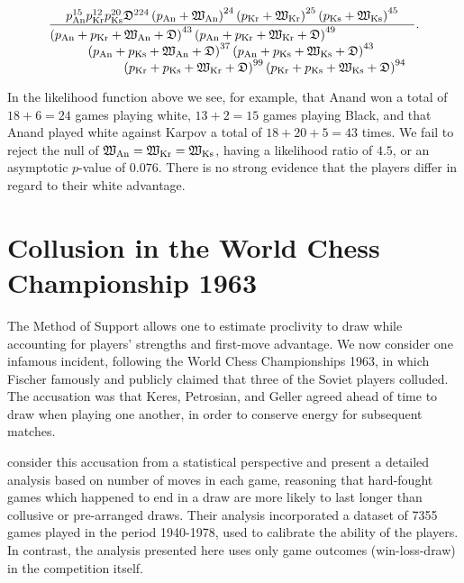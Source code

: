 \documentclass[review]{elsarticle}
\begin{document}
\begin{equation}\label{KKA_personalised_whitemonster}
\frac{
p_\mathrm{An}^{15}
p_\mathrm{Kr}^{12}
p_\mathrm{Ks}^{20}
\draw^{224}
\left(p_\mathrm{An} + \white_\mathrm{An}\right)^{24}%
\left(p_\mathrm{Kr} + \white_\mathrm{Kr}\right)^{25}
\left(p_\mathrm{Ks} + \white_\mathrm{Ks}\right)^{45}
}{\parbox{4in}{$
\left(p_\mathrm{An} + p_\mathrm{Kr} + \white_\mathrm{An} +  \draw\right)^{43}
\left(p_\mathrm{An} + p_\mathrm{Kr} + \white_\mathrm{Kr} +  \draw\right)^{49}\\ \rule{10mm}{0mm}
\left(p_\mathrm{An} + p_\mathrm{Ks} + \white_\mathrm{An} +  \draw\right)^{37}
\left(p_\mathrm{An} + p_\mathrm{Ks} + \white_\mathrm{Ks} +  \draw\right)^{43}\\ \rule{20mm}{0mm}
\left(p_\mathrm{Kr} + p_\mathrm{Ks} + \white_\mathrm{Kr} +  \draw\right)^{99}
\left(p_\mathrm{Kr} + p_\mathrm{Ks} + \white_\mathrm{Ks} +  \draw\right)^{94}
$}}.
\end{equation}

In the likelihood function above we see, for example, that Anand won a
total of $18+6=24$ games playing white, $13+2=15$ games playing Black,
and that Anand played white against Karpov a total of $18+20+5=43$
times.  We fail to reject the null of
$\mathfrak{W}_\mathrm{An}=\mathfrak{W}_\mathrm{Kr}=\mathfrak{W}_\mathrm{Ks}$, having a
likelihood ratio of $4.5$, or an asymptotic $p$-value of $0.076$.
There is no strong evidence that the players differ in regard to their
white advantage.


\section{Collusion in the World Chess Championship 1963}

The Method of Support allows one to estimate proclivity to draw while
accounting for players' strengths and first-move advantage.  We now
consider one infamous incident, following the World Chess
Championships 1963, in which Fischer famously and publicly claimed
that three of the Soviet players colluded.  The accusation was that
Keres, Petrosian, and Geller agreed ahead of time to draw when playing
one another, in order to conserve energy for subsequent matches.

\citet{moul2009} consider this accusation from a statistical
perspective and present a detailed analysis based on number of moves
in each game, reasoning that hard-fought games which happened to end
in a draw are more likely to last longer than collusive or
pre-arranged draws.  Their analysis incorporated a dataset of 7355
games played in the period 1940-1978, used to calibrate the ability of
the players.  In contrast, the analysis presented here uses only game
outcomes (win-loss-draw) in the competition itself.
\end{document}
